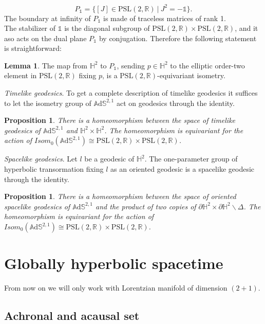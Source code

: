 \documentclass[10pt,a4paper,oneside,reqno]{book}
\def\R{\mathbb{R}}
\def\H{\mathbb{H}}
\def\A{\mathbb{A}\mathrm{d}\mathbb{S}}
\def\1{\mathds{1}}
\def\PSL{\text{PSL}(2,\R)}
\theoremstyle{plain}
\theoremstyle{definition}
\newtheorem{lemma}[theorem]{Lemma} %
\theoremstyle{plain}
\newtheorem{proposition}[theorem]{Proposition}
\theoremstyle{plain}
\theoremstyle{mystyleNormalFont}
\begin{document}
\[
    P_\1 = \{ [J]\in\PSL \ | \ J^2 = -\1 \}.
\]
The boundary at infinity of $P_\1$ is made of traceless matrices of rank 1.\\
The stabilizer of $\1$ is the diagonal subgroup of $\PSL \times \PSL$, and it aso acts on the dual plane $P_\1$ by conjugation. Therefore the following statement is straightforward:
\begin{lemma}\label{lem:dual plane}
    The map from $\H^2$ to $P_\1$, sending $p\in\H^2$ to the elliptic order-two element in $\PSL$ fixing $p$, is a $\PSL$-equivariant isometry.
\end{lemma}

\noindent\textit{Timelike geodesics}.
To get a complete description of timelike geodesics it suffices to let the isometry group of $\A^{2,1}$ act on geodesics through the identity.
\begin{proposition}
    There is a homeomorphism between the space of timelike geodesics of $\A^{2,1}$ and $\H^2 \times \H^2$.
    The homeomorphism is equivariant for the action of $Isom_0(\A^{2,1}) \cong \PSL \times \PSL$.
\end{proposition}

\noindent\textit{Spacelike geodesics}.
Let $l$ be a geodesic of $\H^2$. The one-parameter group of hyperbolic transormation fixing $l$ as an oriented geodesic is a spacelike geodesic through the identity.
\begin{proposition}
    There is a homeomorphism between the space of oriented spacelike geodesics of $\A^{2,1}$ and the product of two copies of $\partial \H^2 \times \partial \H^2 \smallsetminus \Delta$. 
    The homeomorphism is equivariant for the action of $Isom_0(\A^{2,1}) \cong \PSL \times \PSL$.
\end{proposition}

\chapter{Globally hyperbolic spacetime}\label{chapter:4}

From now on we will only work with Lorentzian manifold of dimension $(2+1)$.
\section{Achronal and acausal set}
\end{document}

